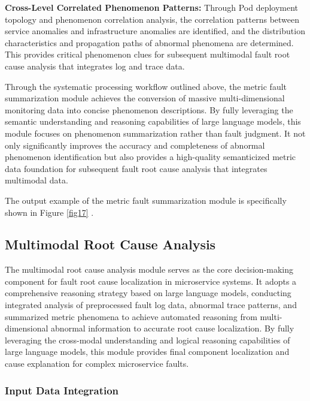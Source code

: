 \documentclass[10pt]{article}
\let\oldref\ref
\renewcommand{\ref}[1]{%
    \textcolor{blue}{\oldref{#1}}%
}
\begin{document}
\textbf{Cross-Level Correlated Phenomenon Patterns:} Through Pod deployment topology and phenomenon correlation analysis, the correlation patterns between service anomalies and infrastructure anomalies are identified, and the distribution characteristics and propagation paths of abnormal phenomena are determined. This provides critical phenomenon clues for subsequent multimodal fault root cause analysis that integrates log and trace data.

Through the systematic processing workflow outlined above, the metric fault summarization module achieves the conversion of massive multi-dimensional monitoring data into concise phenomenon descriptions. By fully leveraging the semantic understanding and reasoning capabilities of large language models, this module focuses on phenomenon summarization rather than fault judgment. It not only significantly improves the accuracy and completeness of abnormal phenomenon identification but also provides a high-quality semanticized metric data foundation for subsequent fault root cause analysis that integrates multimodal data.

The output example of the metric fault summarization module is specifically shown in Figure \ref{fig17}.

\subsection{Multimodal Root Cause Analysis}

The multimodal root cause analysis module serves as the core decision-making component for fault root cause localization in microservice systems. It adopts a comprehensive reasoning strategy based on large language models, conducting integrated analysis of preprocessed fault log data, abnormal trace patterns, and summarized metric phenomena to achieve automated reasoning from multi-dimensional abnormal information to accurate root cause localization. By fully leveraging the cross-modal understanding and logical reasoning capabilities of large language models, this module provides final component localization and cause explanation for complex microservice faults.

\subsubsection{Input Data Integration}
\end{document}

